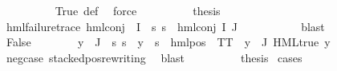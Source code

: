 \begin{isabellebody}
\ \ \ \ \ \ \ \ \isamarkupfalse%
\ True\ {\isasymPsi}{\isacharunderscore}{\kern0pt}def\ \isamarkupfalse%
\ force\isanewline
\ \ \ \ \ \ \isamarkupfalse%
\ \isamarkupfalse%
\ {\isacharquery}{\kern0pt}thesis\ \isamarkupfalse%
\ {\isacartoucheopen}hml{\isacharunderscore}{\kern0pt}failure{\isacharunderscore}{\kern0pt}trace\ {\isacharparenleft}{\kern0pt}hml{\isacharunderscore}{\kern0pt}conj\ {\isacharbraceleft}{\kern0pt}{\isacharbraceright}{\kern0pt}\ I\ {\isasymPsi}{\isacharparenright}{\kern0pt}{\isacartoucheclose}\ {\isacartoucheopen}{\isasymforall}s{\isachardot}{\kern0pt}\ {\isacharparenleft}{\kern0pt}{\isasymnot}{\isacharparenleft}{\kern0pt}s\ {\isasymTurnstile}\ hml{\isacharunderscore}{\kern0pt}conj\ I\ J\ {\isasymPhi}{\isacharparenright}{\kern0pt}{\isacharparenright}{\kern0pt}{\isacartoucheclose}\isanewline
\ \ \ \ \ \ \ \ \isamarkupfalse%
\ blast\isanewline
\ \ \ \ \isamarkupfalse%
\isanewline
\ \ \ \ \ \ \isamarkupfalse%
\ False\isanewline
\ \ \ \ \ \ \isamarkupfalse%
\ {\isachardoublequoteopen}{\isasymforall}y\ {\isasymin}\ {\isasymPhi}{\isacharbackquote}{\kern0pt}J{\isachardot}{\kern0pt}\ {\isasymexists}{\isasymalpha}{\isachardot}{\kern0pt}\ {\isacharparenleft}{\kern0pt}{\isasymforall}s{\isachardot}{\kern0pt}\ {\isacharparenleft}{\kern0pt}s\ {\isasymTurnstile}\ y{\isacharparenright}{\kern0pt}\ {\isasymlongleftrightarrow}\ {\isacharparenleft}{\kern0pt}s\ {\isasymTurnstile}\ {\isacharparenleft}{\kern0pt}hml{\isacharunderscore}{\kern0pt}pos\ {\isasymalpha}\ TT{\isacharparenright}{\kern0pt}{\isacharparenright}{\kern0pt}{\isacharparenright}{\kern0pt}{\isachardoublequoteclose}\ {\isacharbar}{\kern0pt}\ {\isachardoublequoteopen}{\isacharparenleft}{\kern0pt}{\isasymexists}y{\isasymin}{\isasymPhi}\ {\isacharbackquote}{\kern0pt}\ J{\isachardot}{\kern0pt}\ HML{\isacharunderscore}{\kern0pt}true\ y{\isacharparenright}{\kern0pt}{\isachardoublequoteclose}\isanewline
\ \ \ \ \ \ \ \ \isamarkupfalse%
\ neg{\isacharunderscore}{\kern0pt}case\ stacked{\isacharunderscore}{\kern0pt}pos{\isacharunderscore}{\kern0pt}rewriting\ \isamarkupfalse%
\ blast\isanewline
\ \ \ \ \ \ \isamarkupfalse%
\ \isamarkupfalse%
\ {\isacharquery}{\kern0pt}thesis\ \isamarkupfalse%
{\isacharparenleft}{\kern0pt}cases{\isacharparenright}{\kern0pt}\isanewline
\ \ \ \ \ \ \ \ \isamarkupfalse%
\ {}\isanewline
\ \ \ \ \ \ \ \ \isamarkupfalse%

\end{isabellebody}
